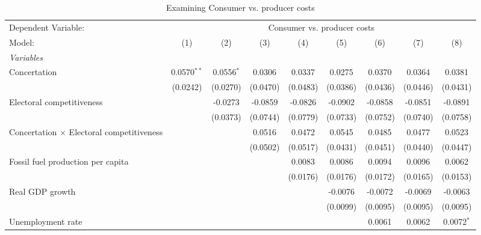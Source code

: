 
\begin{table}[htbp]
   \caption{Examining Consumer vs. producer costs}
   \centering
   \begin{tabular}{lcccccccc}
      \tabularnewline \midrule \midrule
      Dependent Variable: & \multicolumn{8}{c}{Consumer vs. producer costs}\\
      Model:                                           & (1)           & (2)          & (3)      & (4)      & (5)      & (6)      & (7)      & (8)\\  
      \midrule
      \emph{Variables}\\
      Concertation                                     & 0.0570$^{**}$ & 0.0556$^{*}$ & 0.0306   & 0.0337   & 0.0275   & 0.0370   & 0.0364   & 0.0381\\   
                                                       & (0.0242)      & (0.0270)     & (0.0470) & (0.0483) & (0.0386) & (0.0436) & (0.0446) & (0.0431)\\   
      Electoral competitiveness                        &               & -0.0273      & -0.0859  & -0.0826  & -0.0902  & -0.0858  & -0.0851  & -0.0891\\   
                                                       &               & (0.0373)     & (0.0744) & (0.0779) & (0.0733) & (0.0752) & (0.0740) & (0.0758)\\   
      Concertation $\times$ Electoral competitiveness  &               &              & 0.0516   & 0.0472   & 0.0545   & 0.0485   & 0.0477   & 0.0523\\   
                                                       &               &              & (0.0502) & (0.0517) & (0.0431) & (0.0451) & (0.0440) & (0.0447)\\   
      Fossil fuel production per capita                &               &              &          & 0.0083   & 0.0086   & 0.0094   & 0.0096   & 0.0062\\   
                                                       &               &              &          & (0.0176) & (0.0176) & (0.0172) & (0.0165) & (0.0153)\\   
      Real GDP growth                                  &               &              &          &          & -0.0076  & -0.0072  & -0.0069  & -0.0063\\   
                                                       &               &              &          &          & (0.0099) & (0.0095) & (0.0095) & (0.0095)\\   
      Unemployment rate                                &               &              &          &          &          & 0.0061   & 0.0062   & 0.0072$^{*}$\\   

\end{tabular}
\end{table}
